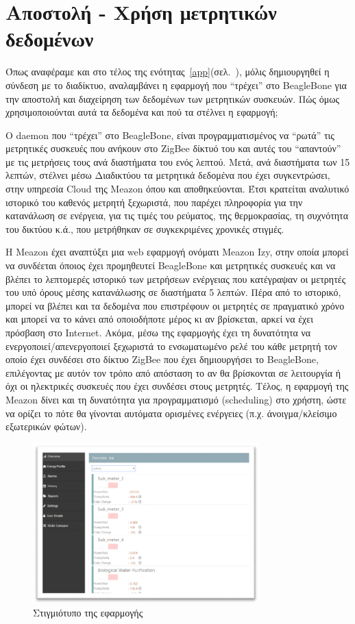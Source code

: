 \documentclass[12pt, a4paper, oneside]{report}
\begin{document}
\section{Αποστολή - Χρήση μετρητικών δεδομένων}

Όπως αναφέραμε και στο τέλος της ενότητας~\ref{app}(σελ.~\pageref{app}), μόλις δημιουργηθεί η σύνδεση με το διαδίκτυο, αναλαμβάνει η εφαρμογή που ``τρέχει'' στο BeagleBone για την αποστολή και διαχείρηση των δεδομένων των μετρητικών συσκευών. Πώς όμως χρησιμοποιούνται αυτά τα δεδομένα και πού τα στέλνει η εφαρμογή;

Ο daemon που ``τρέχει'' στο BeagleBone, είναι προγραμματισμένος να ``ρωτά'' τις μετρητικές συσκευές που ανήκουν στο ZigBee δίκτυό του και αυτές του ``απαντούν'' με τις μετρήσεις τους ανά διαστήματα του ενός λεπτού. Μετά, ανά διαστήματα των 15 λεπτών, στέλνει μέσω Διαδικτύου τα μετρητικά δεδομένα που έχει συγκεντρώσει, στην υπηρεσία Cloud της Meazon όπου και αποθηκεύονται. Έτσι κρατείται αναλυτικό ιστορικό του καθενός μετρητή ξεχωριστά, που παρέχει πληροφορία για την κατανάλωση σε ενέργεια, για τις τιμές του ρεύματος, της θερμοκρασίας, τη συχνότητα του δικτύου κ.ά., που μετρήθηκαν σε συγκεκριμένες χρονικές στιγμές.

Η Meazon έχει αναπτύξει μια web εφαρμογή ονόματι Meazon Izy, στην οποία μπορεί να συνδέεται όποιος έχει προμηθευτεί BeagleBone και μετρητικές συσκευές και να βλέπει το λεπτομερές ιστορικό των μετρήσεων ενέργειας που κατέγραψαν οι μετρητές του υπό όρους μέσης κατανάλωσης σε διαστήματα 5 λεπτών. Πέρα από το ιστορικό, μπορεί να βλέπει και τα δεδομένα που επιστρέφουν οι μετρητές σε πραγματικό χρόνο και μπορεί να το κάνει από οποιοδήποτε μέρος κι αν βρίσκεται, αρκεί να έχει πρόσβαση στο Internet. Ακόμα, μέσω της εφαρμογής έχει τη δυνατότητα να ενεργοποιεί\slash απενεργοποιεί ξεχωριστά το ενσωματωμένο ρελέ του κάθε μετρητή τον οποίο έχει συνδέσει στο δίκτυο ZigBee που έχει δημιουργήσει το BeagleBone, επιλέγοντας με αυτόν τον τρόπο από απόσταση το αν θα βρίσκονται σε λειτουργία ή όχι οι ηλεκτρικές συσκευές που έχει συνδέσει στους μετρητές. Τέλος, η εφαρμογή της Meazon δίνει και τη δυνατότητα για προγραμματισμό (scheduling) στο χρήστη, ώστε να ορίζει το πότε θα γίνονται αυτόματα ορισμένες ενέργειες (π.χ. άνοιγμα\slash κλείσιμο εξωτερικών φώτων).

\begin{figure}[!ht]
\centering
\includegraphics[width=0.78\textwidth]{eikona_37}
\caption[Στιγμιότυπο της εφαρμογής]{Στιγμιότυπο της εφαρμογής\cite{meazon}}\label{eik37}
\end{figure}
\end{document}
